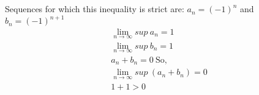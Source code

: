 \documentclass[paper=a4, fontsize=11pt]{scrartcl} %
\numberwithin{equation}{section} %
\numberwithin{figure}{section} %
\numberwithin{table}{section} %
\begin{document}
\subsection{}
Sequences for which this inequality is strict are:
$a_n=(-1)^n$ and $b_n=(-1)^{n+1}$\\
\begin{align*}
	\lim_{n\rightarrow\infty} sup\ a_n = 1\\
	\lim_{n\rightarrow\infty} sup\ b_n = 1\\
	a_n + b_n = 0\ \text{So,}\\
	\lim_{n\rightarrow\infty} sup\ (a_n + b_n) = 0\\
	1+1 > 0
\end{align*}
\end{document}
